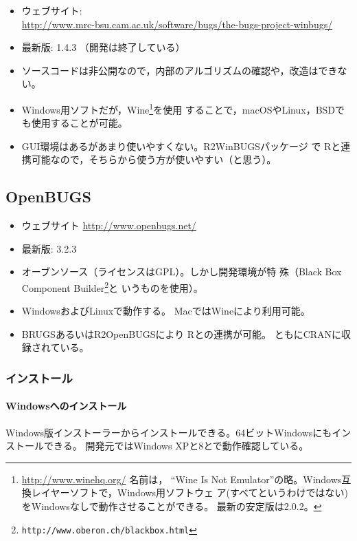 \documentclass[11pt,uplatex]{jsarticle}
\begin{document}
\begin{itemize}
\item ウェブサイト:\\
  \url{http://www.mrc-bsu.cam.ac.uk/software/bugs/the-bugs-project-winbugs/}
\item 最新版: 1.4.3 （開発は終了している）
\item ソースコードは非公開なので，内部のアルゴリズムの確認や，改造はできない。
\item Windows用ソフトだが，\textsf{Wine}\footnote{\url{http://www.winehq.org/} 名前は，
``Wine Is Not Emulator''の略。Windows互換レイヤーソフトで，Windows用ソフトウェ
  ア(すべてというわけではない)をWindowsなしで動作させることができる。
  最新の安定版は2.0.2。}を使用
  することで，macOSやLinux，BSDでも使用することが可能。
\item GUI環境はあるがあまり使いやすくない。\textsf{R2WinBUGS}パッケージ
  で \textsf{R}と連携可能なので，そちらから使う方が使いやすい（と思う）。
\end{itemize}

\subsection{OpenBUGS}

\begin{itemize}
\item ウェブサイト \url{http://www.openbugs.net/}
\item 最新版: 3.2.3
\item オーブンソース（ライセンスはGPL）。しかし開発環境が特
  殊（Black Box Component Builder\footnote{\texttt{http://www.oberon.ch/blackbox.html}}と
  いうものを使用）。
\item WindowsおよびLinuxで動作する。
Macでは\textsf{Wine}により利用可能。
\item \textsf{BRUGS}あるいは\textsf{R2OpenBUGS}により
\textsf{R}との連携が可能\cite{Thomas}。
ともにCRANに収録されている。
\end{itemize}

\subsubsection*{インストール}
\paragraph{Windowsへのインストール}
Windows版インストーラーからインストールできる。64ビットWindowsにもインストールできる。
開発元ではWindows XPと8とで動作確認している。
\end{document}
